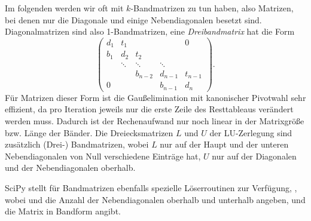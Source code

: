Im folgenden werden wir oft mit $k$-Bandmatrizen zu tun haben, also
Matrizen, bei denen nur die Diagonale und einige Nebendiagonalen
besetzt sind. Diagonalmatrizen sind also 1-Bandmatrizen, eine
\emph{Dreibandmatrix} hat die Form
\begin{equation}
  \begin{pmatrix}
    d_1 & t_1    &     & & 0 \\
    b_1 & d_2    & t_2 \\
    {}  & \ddots & \ddots & \ddots \\
    {}  &        & b_{n-2} & d_{n-1} & t_{n-1}\\
    0   &        &        & b_{n-1} & d_n
  \end{pmatrix}.
\end{equation}
Für Matrizen dieser Form ist die Gaußelimination mit kanonischer
Pivotwahl sehr effizient, da pro Iteration jeweils nur die erste Zeile
des Resttableaus verändert werden muss. Dadurch ist der Rechenaufwand
nur noch linear in der Matrixgröße bzw. Länge der Bänder. Die
Dreiecksmatrizen $L$ und $U$ der LU-Zerlegung sind zusätzlich
(Drei-) Bandmatrizen, wobei $L$ nur auf der Haupt und der unteren
Nebendiagonalen von Null verschiedene Einträge hat, $U$ nur auf der
Diagonalen und der Nebendiagonalen oberhalb.

SciPy stellt für Bandmatrizen ebenfalls spezielle Löserroutinen zur
Verfügung, ,
wobei  und  die Anzahl der Nebendiagonalen oberhalb
und unterhalb angeben, und  die Matrix in Bandform
angibt.


